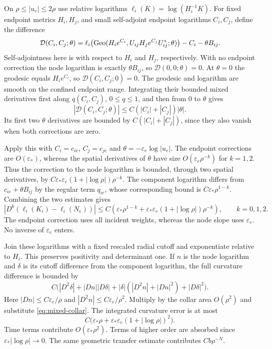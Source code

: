 On $\rho\le|u_e|\le2\rho$ use relative logarithms
$\ell_i(K)=\log(H_i^{-1}K)$.
For fixed endpoint metrics $H_i,H_j$, and
small self-adjoint endpoint logarithms $C_i,C_j$,
define the difference
\[
 \mathcal D(C_i,C_j;\theta)
 =\ell_i\!\left(\operatorname{Geo}(H_i e^{C_i},
              U_{ij}H_j e^{C_j}U_{ij}^*;\theta)\right)
                 -C_i-\theta B_{ij}.
\]
Self-adjointness here is with respect to
$H_i$ and $H_j$, respectively.
With no endpoint correction the node logarithm
is exactly $\theta B_{ij}$, so
$\mathcal D(0,0;\theta)=0$. At $\theta=0$
the geodesic equals $H_i e^{C_i}$, so
$\mathcal D(C_i,C_j;0)=0$.
The geodesic and logarithm are smooth on the
confined endpoint range. Integrating their
bounded mixed derivatives first along
$q(C_i,C_j)$, $0\le q\le1$, and then from
$0$ to $\theta$ gives
\[
 |\mathcal D(C_i,C_j;\theta)|
       \le C(|C_i|+|C_j|)|\theta|.
\]
Its first two $\theta$ derivatives are bounded
by $C(|C_i|+|C_j|)$, since they also vanish
when both corrections are zero.

Apply this with $C_i=c_{ie}$, $C_j=c_{je}$
and $\theta=-\varepsilon_e\log|u_e|$.
The endpoint corrections are $O(\varepsilon_*)$,
whereas the spatial derivatives of $\theta$
have size $O(\varepsilon_e\rho^{-k})$
for $k=1,2$. Thus the correction to the node
logarithm is bounded, through two spatial
derivatives, by
$C\varepsilon_*\varepsilon_e
(1+|\log\rho|)\rho^{-k}$.
The component logarithm differs from
$c_{ie}+\theta B_{ij}$ by the regular term
$q_{ie}$, whose corresponding bound is
$C\varepsilon_*\rho^{1-k}$.
Combining the two estimates gives
\begin{equation}\label{eq:mixed-collar}
 |D^k(\ell_i(K_i)-\ell_i(N_e))|
 \le C\left(
 \varepsilon_*\rho^{1-k}
 +\varepsilon_*\varepsilon_e(1+|\log\rho|)\rho^{-k}
 \right),\qquad k=0,1,2.
\end{equation}
The endpoint correction uses all incident weights,
whereas the node slope uses $\varepsilon_e$.
No inverse of $\varepsilon_e$ enters.

Join these logarithms with a fixed rescaled radial
cutoff and exponentiate relative to $H_i$. This
preserves positivity and determinant one. If $n$
is the node logarithm and $\delta$ is its cutoff
difference from the component logarithm, the full
curvature difference is bounded by
\[
 C\big(
 |D^2\delta|+|Dn||D\delta|
 +|\delta|(|D^2n|+|Dn|^2)+|D\delta|^2
 \big).
\]
Here $|Dn|\le C\varepsilon_e/\rho$ and
$|D^2n|\le C\varepsilon_e/\rho^2$.
Multiply by the collar area $O(\rho^2)$ and
substitute \eqref{eq:mixed-collar}. The integrated
curvature error is at most
\[
 C\big(\varepsilon_*\rho+
       \varepsilon_*\varepsilon_e(1+|\log\rho|)^2\big).
\]
Time terms contribute $O(\varepsilon_*\rho^2)$.
Terms of higher order are absorbed since
$\varepsilon_*|\log\rho|\to0$. The same geometric
transfer estimate contributes $Cb\rho^{-N}$.

